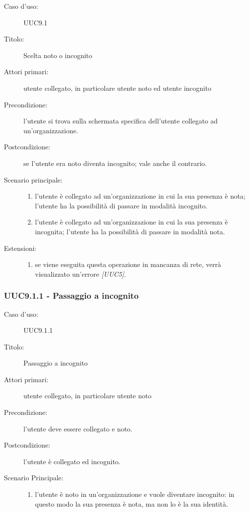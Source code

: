 \documentclass[casi-duso]{subfiles}
\begin{document}
\begin{description}
  \item[Caso d’uso:] UUC9.1
  \item[Titolo:] Scelta noto o incognito
  \item[Attori primari:] utente collegato, in particolare utente noto ed utente incognito
  \item[Precondizione:] l'utente si trova sulla schermata specifica dell'utente collegato ad un'organizzazione.
  \item[Postcondizione:] se l'utente era noto diventa incognito; vale anche il contrario.
  \item[Scenario principale:]
        \begin{enumerate}
          \item l'utente è collegato ad un'organizzazione in cui la sua presenza è nota; l'utente ha la possibilità di passare in modalità incognito.
          \item l'utente è collegato ad un'organizzazione in cui la sua presenza è incognita; l'utente ha la possibilità di passare in modalità nota.
        \end{enumerate}
  \item[Estensioni:]
        \begin{enumerate}
          \item se viene eseguita questa operazione in mancanza di rete, verrà visualizzato un'errore \emph{[UUC5]}.
        \end{enumerate}
\end{description}

\subsubsection{UUC9.1.1 - Passaggio a incognito}%
\label{subsub:UUC9.1.1utente}
\begin{description}
  \item[Caso d’uso:] UUC9.1.1
  \item[Titolo:] Passaggio a incognito
  \item[Attori primari:] utente collegato, in particolare utente noto
  \item[Precondizione:] l'utente deve essere collegato e noto.
  \item[Postcondizione:] l'utente è collegato ed incognito.
  \item[Scenario Principale:]
        \begin{enumerate}
          \item l'utente è noto in un'organizzazione e vuole diventare incognito: in questo modo la sua presenza è nota, ma non lo è la sua identità.
        \end{enumerate}
\end{description}
\end{document}
